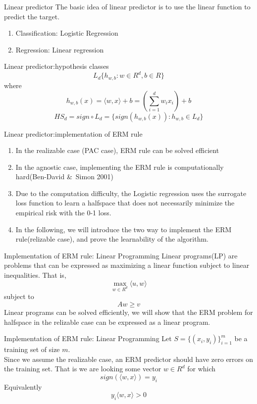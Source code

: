 \documentclass{beamer}
\begin{document}
\begin{frame}{Linear predictor}
	The basic idea of linear predictor is to use the linear function to predict the target.
	\begin{enumerate}
			\item Classification: Logistic Regression
			\item Regression: Linear regression
	\end{enumerate}
\end{frame}
\begin{frame}{Linear predictor:hypothesis classes}
	\[L_d\{h_{w,b}: w \in R^d,b \in R\}\]
	where
	\[h_{w,b}(x) = \langle w,x \rangle +b = (\sum^d_{i=1} w_i x_i) + b\]
	\[HS_d = sign \circ L_d = \{sign(h_{w,b}(x)):h_{w,b} \in L_d\}\]
\end{frame}
\begin{frame}{Linear predictor:implementation of ERM rule}
	\begin{enumerate}
		\item In the realizable case (PAC case), ERM rule can be solved efficient
		\item In the agnostic case, implementing the ERM rule is computationally hard(Ben-David \&\ Simon 2001)
		\item Due to the computation difficulty, the Logistic regression uses the surrogate loss function to learn a halfspace that does not necessarily minimize the empirical risk with the 0-1 loss. 
		\item In the following, we will introduce the two way to implement the ERM rule(relizable case), and prove the learnability of the algorithm.
	\end{enumerate}
\end{frame}
\begin{frame}{Implementation of ERM rule: Linear Programming}
	Linear programs(LP) are problems that can be expressed as maximizing a linear function subject to linear inequalities. That is,
	\[\max_{w \in R^d} \langle u,w \rangle \]
	subject to
	\[Aw \geq v\]
	Linear programs can be solved efficiently, we will show that the ERM problem for halfspace in the relizable case can be expressed as a linear program.
\end{frame}
\begin{frame}{Implementation of ERM rule: Linear Programming}
	Let $S = \{(x_i,y_i)\}^m_{i=1}$ be a training set of size $m$. \\
	Since we assume the realizable case, an ERM predictor should have zero errors on the training set. That is we are looking some vector $w \in R^d$ for which
	\[sign(\langle w,x \rangle) = y_i\]
	Equivalently
	\[y_i \langle w,x \rangle > 0\]
\end{frame}
\end{document}
